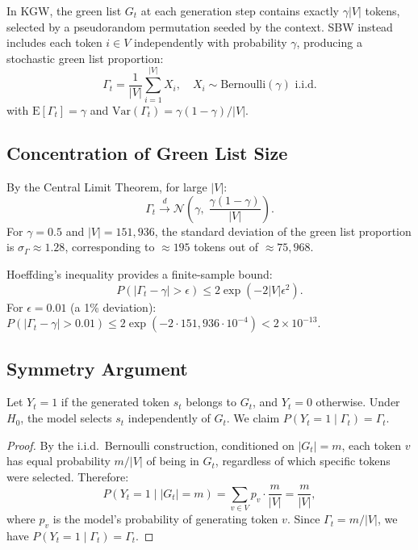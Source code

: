 \documentclass[11pt]{article}
\begin{document}
In KGW, the green list $G_t$ at each generation step contains exactly $\gamma|V|$ tokens, selected by a pseudorandom permutation seeded by the context. SBW instead includes each token $i \in V$ independently with probability $\gamma$, producing a stochastic green list proportion:
\begin{equation}
\Gamma_t = \frac{1}{|V|}\sum_{i=1}^{|V|} X_i, \quad X_i \sim \text{Bernoulli}(\gamma) \text{ i.i.d.}
\end{equation}
with $\mathrm{E}[\Gamma_t] = \gamma$ and $\mathrm{Var}(\Gamma_t) = \gamma(1-\gamma)/|V|$.

\subsection{Concentration of Green List Size}

By the Central Limit Theorem, for large $|V|$:
\begin{equation}
\Gamma_t \xrightarrow{d} \mathcal{N}\!\left(\gamma,\; \frac{\gamma(1-\gamma)}{|V|}\right).
\end{equation}
For $\gamma = 0.5$ and $|V| = 151{,}936$, the standard deviation of the green list proportion is $\sigma_\Gamma \approx 1.28$\textperthousand, corresponding to ${\approx}195$ tokens out of ${\approx}75{,}968$.

Hoeffding's inequality provides a finite-sample bound:
\begin{equation}
P(|\Gamma_t - \gamma| > \epsilon) \leq 2\exp(-2|V|\epsilon^2).
\end{equation}
For $\epsilon = 0.01$ (a 1\% deviation): $P(|\Gamma_t - \gamma| > 0.01) \leq 2\exp(-2 \cdot 151{,}936 \cdot 10^{-4}) < 2 \times 10^{-13}$.

\subsection{Symmetry Argument}

Let $Y_t = 1$ if the generated token $s_t$ belongs to $G_t$, and $Y_t = 0$ otherwise. Under $H_0$, the model selects $s_t$ independently of $G_t$. We claim $P(Y_t = 1 \mid \Gamma_t) = \Gamma_t$.

\begin{proof}
By the i.i.d.\ Bernoulli construction, conditioned on $|G_t| = m$, each token $v$ has equal probability $m/|V|$ of being in $G_t$, regardless of which specific tokens were selected. Therefore:
\begin{equation}
P(Y_t = 1 \mid |G_t| = m) = \sum_{v \in V} p_v \cdot \frac{m}{|V|} = \frac{m}{|V|},
\end{equation}
where $p_v$ is the model's probability of generating token $v$. Since $\Gamma_t = m/|V|$, we have $P(Y_t = 1 \mid \Gamma_t) = \Gamma_t$.
\end{proof}
\end{document}
